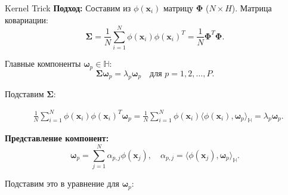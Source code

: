 \begin{frame}[allowframebreaks]{Kernel Trick}
    \textbf{Подход:}
    Составим из $\phi(\boldsymbol{x}_i)$ матрицу $\boldsymbol{\Phi}$ ($N \times H$). Матрица ковариации:
    \begin{equation*}
        \boldsymbol{\Sigma} = \frac{1}{N}\sum_{i=1}^N\phi(\boldsymbol{x}_i)\phi(\boldsymbol{x}_i)^T = \frac{1}{N}\boldsymbol{\Phi}^T\boldsymbol{\Phi}.
    \end{equation*}

    Главные компоненты $\mathbf{\omega}_p \in \mathbb{H}$:
    \begin{equation*}
        \boldsymbol{\Sigma}\mathbf{\omega}_p = \lambda_p\mathbf{\omega}_p \quad \text{для } p = 1, 2, \ldots, P.
    \end{equation*}

    \framebreak

    Подставим $\boldsymbol{\Sigma}$:

    \begin{align*}
         & \frac{1}{N}\sum_{i=1}^N\phi(\boldsymbol{x}_i)\phi(\boldsymbol{x}_i)^T\mathbf{\omega}_p =  \frac{1}{N}\sum_{i=1}^N\phi(\boldsymbol{x}_i)\langle\phi(\boldsymbol{x}_i), \mathbf{\omega}_p\rangle_{\mathbb{H}} = \lambda_p\mathbf{\omega}_p.
    \end{align*}

    \textbf{Представление компонент:}
    \begin{equation*}
        \mathbf{\omega}_p = \sum_{j=1}^N \alpha_{p,j}\phi(\boldsymbol{x}_j), \quad \alpha_{p,j} = \langle\phi(\boldsymbol{x}_j), \mathbf{\omega}_p\rangle_{\mathbb{H}}.
    \end{equation*}

    \framebreak

    Подставим это в уравнение для $\mathbf{\omega}_p$:


\end{frame}

